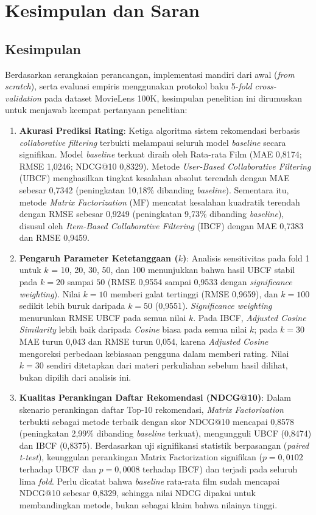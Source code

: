 \chapter{Kesimpulan dan Saran}

\section{Kesimpulan}
Berdasarkan serangkaian perancangan, implementasi mandiri dari awal (\textit{from scratch}), serta evaluasi empiris menggunakan protokol baku 5-\textit{fold cross-validation} pada dataset MovieLens 100K, kesimpulan penelitian ini dirumuskan untuk menjawab keempat pertanyaan penelitian:
\begin{enumerate}
    \item \textbf{Akurasi Prediksi Rating}: Ketiga algoritma sistem rekomendasi berbasis \textit{collaborative filtering} terbukti melampaui seluruh model \textit{baseline} secara signifikan. Model \textit{baseline} terkuat diraih oleh Rata-rata Film (MAE 0,8174; RMSE 1,0246; NDCG@10 0,8329). Metode \textit{User-Based Collaborative Filtering} (UBCF) menghasilkan tingkat kesalahan absolut terendah dengan MAE sebesar 0,7342 (peningkatan 10,18\% dibanding \textit{baseline}). Sementara itu, metode \textit{Matrix Factorization} (MF) mencatat kesalahan kuadratik terendah dengan RMSE sebesar 0,9249 (peningkatan 9,73\% dibanding \textit{baseline}), disusul oleh \textit{Item-Based Collaborative Filtering} (IBCF) dengan MAE 0,7383 dan RMSE 0,9459.
    
    \item \textbf{Pengaruh Parameter Ketetanggaan ($k$)}: Analisis sensitivitas pada fold 1 untuk $k$ = 10, 20, 30, 50, dan 100 menunjukkan bahwa hasil UBCF stabil pada $k = 20$ sampai $50$ (RMSE 0,9554 sampai 0,9533 dengan \textit{significance weighting}). Nilai $k=10$ memberi galat tertinggi (RMSE 0,9659), dan $k=100$ sedikit lebih buruk daripada $k=50$ (0,9551). \textit{Significance weighting} menurunkan RMSE UBCF pada semua nilai $k$. Pada IBCF, \textit{Adjusted Cosine Similarity} lebih baik daripada \textit{Cosine} biasa pada semua nilai $k$; pada $k=30$ MAE turun 0,043 dan RMSE turun 0,054, karena \textit{Adjusted Cosine} mengoreksi perbedaan kebiasaan pengguna dalam memberi rating. Nilai $k=30$ sendiri ditetapkan dari materi perkuliahan sebelum hasil dilihat, bukan dipilih dari analisis ini.
    
    \item \textbf{Kualitas Perankingan Daftar Rekomendasi (NDCG@10)}: Dalam skenario perankingan daftar Top-10 rekomendasi, \textit{Matrix Factorization} terbukti sebagai metode terbaik dengan skor NDCG@10 mencapai 0,8578 (peningkatan 2,99\% dibanding \textit{baseline} terkuat), mengungguli UBCF (0,8474) dan IBCF (0,8375). Berdasarkan uji signifikansi statistik berpasangan (\textit{paired t-test}), keunggulan perankingan Matrix Factorization signifikan ($p = 0,0102$ terhadap UBCF dan $p = 0,0008$ terhadap IBCF) dan terjadi pada seluruh lima \textit{fold}. Perlu dicatat bahwa \textit{baseline} rata-rata film sudah mencapai NDCG@10 sebesar 0,8329, sehingga nilai NDCG dipakai untuk membandingkan metode, bukan sebagai klaim bahwa nilainya tinggi.
    

\end{enumerate}
